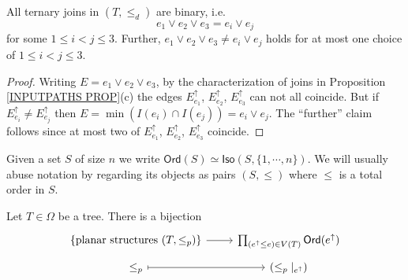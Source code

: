 \documentclass[a4paper,10pt]{article}%
\begin{document}
\begin{proposition}
\label{TERNARYJOIN PROP}
All ternary joins in $(T,\leq_d)$ are binary, i.e.
\[ e_1 \vee e_2 \vee e_3 = e_i \vee e_j\]
for some $1\leq i <j \leq 3$. Further, $e_1 \vee e_2 \vee e_3 \neq e_i \vee e_j$ holds for at most one choice of $1\leq i <j \leq 3$.
\end{proposition}

\begin{proof}
Writing $E = e_1 \vee e_2 \vee e_3$, by the characterization of joins in Proposition \ref{INPUTPATHS PROP}(c) the edges
$E^{\uparrow}_{e_1}$, $E^{\uparrow}_{e_2}$, $E^{\uparrow}_{e_3}$
can not all coincide. But if $E^{\uparrow}_{e_i}\neq E^{\uparrow}_{e_j}$ then
$E = \min(I(e_i) \cap I(e_j)) = e_i \vee e_j$.
The ``further'' claim follows since at most two of 
$E^{\uparrow}_{e_1}$, $E^{\uparrow}_{e_2}$, $E^{\uparrow}_{e_3}$
coincide.
\end{proof}

\begin{notation}
	Given a set $S$ of size $n$ we write
	$\textsf{Ord}(S) \simeq \mathsf{Iso}(S,\{1,\cdots,n\})$. We will usually abuse notation by regarding its objects as pairs $(S,\leq)$ where $\leq$ is a total order in $S$.
\end{notation}


\begin{proposition}\label{PLANARIZATIONCHAR PROP}
	Let $T \in \Omega$ be a tree. There is a bijection
	\begin{equation}\label{PLANAR EQ}
	\begin{tikzcd}[row sep = 0.5em]
		\{\text{planar structures }(T,\leq_p)\} \ar[r] &
		\prod_{(e^{\uparrow} \leq e) \in V(T)} \mathsf{Ord}(e^{\uparrow}) \\
		\leq_p \ar[mapsto]{r} & (\leq_p|_{e^{\uparrow}})
	\end{tikzcd}	
	\end{equation}
\end{proposition}
\end{document}
